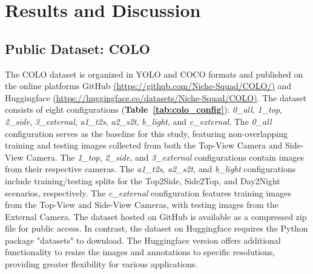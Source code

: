 \section{Results and Discussion}

\subsection*{Public Dataset: COLO}

The COLO dataset is organized in YOLO and COCO formats and published on the online platforms GitHub \href{https://github.com/Niche-Squad/COLO/}{(https://github.com/Niche-Squad/COLO/)} and Huggingface \href{https://huggingface.co/datasets/Niche-Squad/COLO}{(https://huggingface.co/datasets/Niche-Squad/COLO)}. The dataset consists of eight configurations (\textbf{Table~\ref{tab:colo_config}}):
\textit{0\_all}, \textit{1\_top}, \textit{2\_side}, \textit{3\_external}, \textit{a1\_t2s}, \textit{a2\_s2t}, \textit{b\_light}, and \textit{c\_external}. The \textit{0\_all} configuration serves as the baseline for this study, featuring non-overlapping training and testing images collected from both the Top-View Camera and Side-View Camera. The \textit{1\_top}, \textit{2\_side}, and \textit{3\_external} configurations contain images from their respective cameras. The \textit{a1\_t2s}, \textit{a2\_s2t}, and \textit{b\_light} configurations include training/testing splits for the Top2Side, Side2Top, and Day2Night scenarios, respectively. The \textit{c\_external} configuration features training images from the Top-View and Side-View Cameras, with testing images from the External Camera. The dataset hosted on GitHub is available as a compressed zip file for public access. In contrast, the dataset on Huggingface requires the Python package "datasets" \cite{datasets} to download. The Huggingface version offers additional functionality to resize the images and annotations to specific resolutions, providing greater flexibility for various applications.

